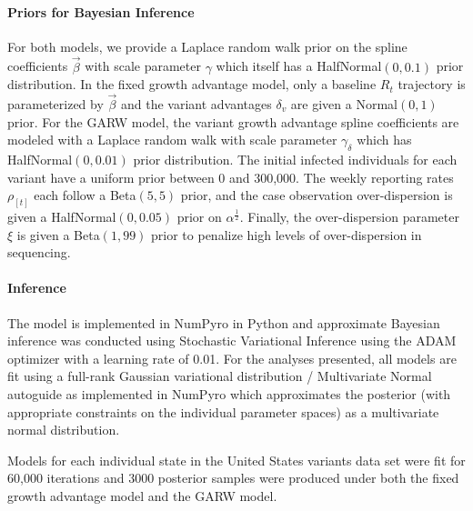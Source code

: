 
\paragraph{Priors for Bayesian Inference}%

For both models, we provide a Laplace random walk prior on the spline coefficients $\vec{\beta}$ with scale parameter $\gamma$ which itself has a HalfNormal$(0, 0.1)$ prior distribution.
In the fixed growth advantage model, only a baseline $R_{t}$ trajectory is parameterized by $\vec{\beta}$ and the variant advantages $\delta_{v}$ are given a Normal$(0,1)$ prior.
For the GARW model, the variant growth advantage spline coefficients are modeled with a Laplace random walk with scale parameter $\gamma_{\delta}$ which has HalfNormal$(0, 0.01)$ prior distribution.
The initial infected individuals for each variant have a uniform prior between 0 and 300,000.
The weekly reporting rates $\rho_{[t]}$ each follow a Beta$(5, 5)$ prior, and the case observation over-dispersion is given a HalfNormal$(0, 0.05)$ prior on $\alpha^{\frac{1}{2}}$.
Finally, the over-dispersion parameter $\xi$ is given a Beta$(1, 99)$ prior to penalize high levels of over-dispersion in sequencing.

\paragraph{Inference}

The model is implemented in NumPyro \cite{phan2019composable} in Python and approximate Bayesian inference was conducted using Stochastic Variational Inference \cite{hoffman2013svi} using the ADAM optimizer \cite{kingma2017adam} with a learning rate of 0.01. For the analyses presented, all models are fit using a full-rank Gaussian variational distribution / Multivariate Normal autoguide as implemented in NumPyro \cite{phan2019composable} which approximates the posterior (with appropriate constraints on the individual parameter spaces) as a multivariate normal distribution.

Models for each individual state in the United States variants data set were fit for 60,000 iterations and 3000 posterior samples were produced under both the fixed growth advantage model and the GARW model.

